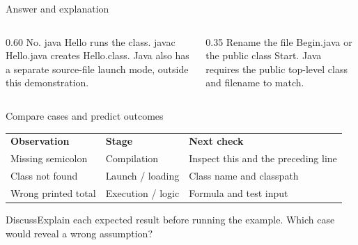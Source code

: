 \documentclass[10pt,aspectratio=169]{beamer}
\begin{document}
\begin{frame}[fragile,t]{Answer and explanation}
\begin{columns}[T,onlytextwidth]\begin{column}{0.60\textwidth}
No. java Hello runs the class. javac Hello.java creates Hello.class. Java also has a separate source-file launch mode, outside this demonstration.
\end{column}\begin{column}{0.35\textwidth}\small
Rename the file Begin.java or the public class Start. Java requires the public top-level class and filename to match.
\end{column}\end{columns}
\end{frame}


\begin{frame}[fragile,t]{Compare cases and predict outcomes}
\small\renewcommand{\arraystretch}{1.5}
\begin{tabularx}{\textwidth}{>{\raggedright\arraybackslash}X>{\raggedright\arraybackslash}X>{\raggedright\arraybackslash}X}\rowcolor{navy}
\color{white}\bfseries Observation & \color{white}\bfseries Stage & \color{white}\bfseries Next check\\
Missing semicolon & Compilation & Inspect this and the preceding line\\
Class not found & Launch / loading & Class name and classpath\\
Wrong printed total & Execution / logic & Formula and test input\\
\end{tabularx}\par\vspace{3mm}\begin{exampleblock}{Discuss}Explain each expected result before running the example. Which case would reveal a wrong assumption?\end{exampleblock}
\end{frame}
\end{document}
